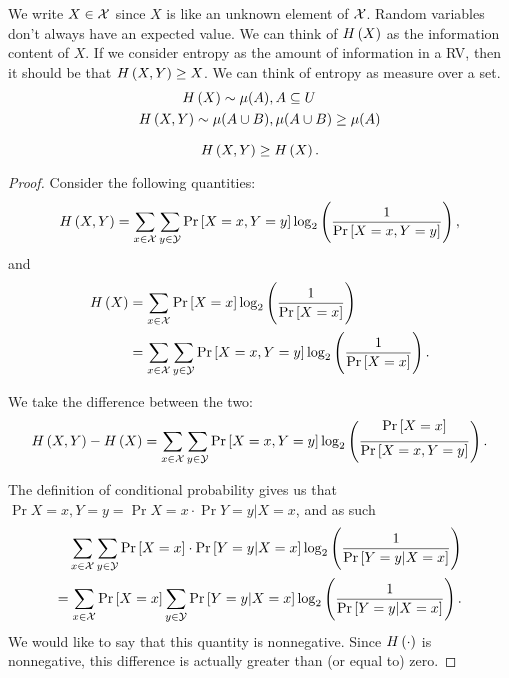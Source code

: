 We write $X \in \mathcal{X}$ since $X$ is like an unknown element of $\mathcal{X}$.
Random variables don't always have an expected value.
We can think of $H\left({X}\right)$ as the information content of $X$.
If we consider entropy as the amount of information in a \ac{RV}, then it should be that $H\left({X,Y}\right) \ge X$.
We can think of entropy as  measure over a set.
\begin{align*}
	H\left({X}\right) \sim \mu(A), & \, A \subseteq U
	\\
	H\left({X,Y}\right) \sim \mu(A \cup B), & \, \mu(A \cup B) \geq \mu(A)
\end{align*}

\begin{prop}
	\begin{equation*}
		H\left({X,Y}\right) \ge H\left({X}\right).   
	\end{equation*}
\end{prop}

\begin{proof}
	Consider the following quantities:
	\begin{equation*}
		H\left({X,Y}\right)
		=
		\sum_{x \in \mathcal{X}} \sum_{y \in \mathcal{Y}} \mathop{\mathrm{Pr}}\limits_{} \left[ {X = x, Y = y} \right]
		\log_2 \left( \frac{1}{\mathop{\mathrm{Pr}}\limits_{} \left[ {X = x, Y = y} \right]} \right),
	\end{equation*}
	and
	\begin{align*}
		H\left({X}\right)
		& =
		\sum_{x \in \mathcal{X}} \mathop{\mathrm{Pr}}\limits_{} \left[ {X = x} \right] \log_2 \left( \frac{1}{\mathop{\mathrm{Pr}}\limits_{} \left[ {X=x} \right]} \right)
		\\
		& =
		\sum_{x \in \mathcal{X}} \sum_{y \in \mathcal{Y}} \mathop{\mathrm{Pr}}\limits_{} \left[ {X = x, Y = y} \right]
		\log_2 \left( \frac{1}{\mathop{\mathrm{Pr}}\limits_{} \left[ {X = x} \right]} \right).
	\end{align*} 

	We take the difference between the two:
	\begin{equation*}
		H\left({X,Y}\right) - H\left({X}\right)
		=
		\sum_{x \in \mathcal{X}} \sum_{y \in \mathcal{Y}}
		\mathop{\mathrm{Pr}}\limits_{} \left[ {X = x, Y = y} \right]
		\log_2 \left( \frac{\mathop{\mathrm{Pr}}\limits_{} \left[ {X = x} \right]}{\mathop{\mathrm{Pr}}\limits_{} \left[ {X = x, Y = y} \right]} \right).
	\end{equation*}

	The definition of conditional probability gives us that $\Pr{X = x, Y = y} = \Pr{X = x} \cdot \Pr{Y = y | X = x}$, and as such
	\begin{align*}
		\sum_{x \in \mathcal{X}} \sum_{y \in \mathcal{Y}} \mathop{\mathrm{Pr}}\limits_{} \left[ {X = x} \right] \cdot \mathop{\mathrm{Pr}}\limits_{} \left[ {Y = y | X = x} \right]
		\log_2 \left( \frac{1}{\mathop{\mathrm{Pr}}\limits_{} \left[ {Y = y | X = x} \right]} \right)
		\\
		=
		\sum_{x \in \mathcal{X}} \mathop{\mathrm{Pr}}\limits_{} \left[ {X = x} \right] \sum_{y \in \mathcal{Y}} \mathop{\mathrm{Pr}}\limits_{} \left[ {Y = y | X = x} \right]
		\log_2 \left( \frac{1}{\mathop{\mathrm{Pr}}\limits_{} \left[ {Y = y | X = x} \right]} \right).
	\end{align*}
	We would like to say that this quantity is nonnegative.
	Since $H\left({\cdot}\right)$ is nonnegative, this difference is actually greater than (or equal to) zero.
\end{proof}

